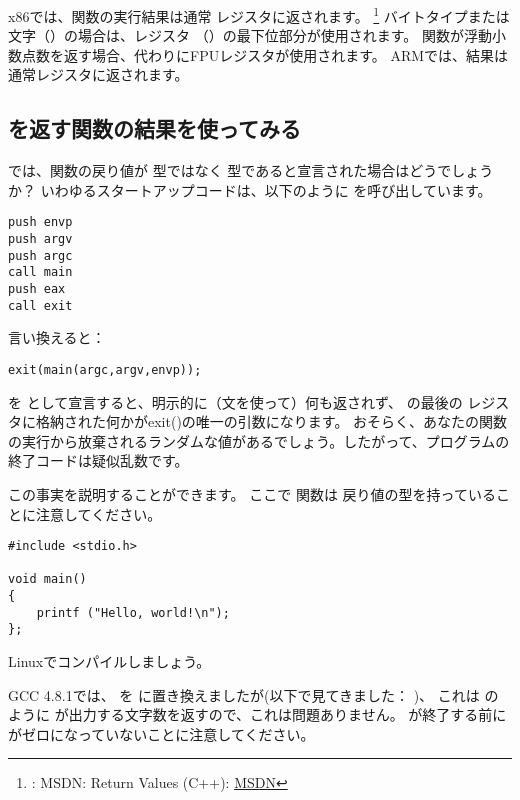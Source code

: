 

x86では、関数の実行結果は通常 \EAX レジスタに返されます。
\footnote{\Seealso: MSDN: Return Values (C++): \href{http://go.yurichev.com/17258}{MSDN}}
バイトタイプまたは文字（\Tchar）の場合は、レジスタ \EAX （\AL）の最下位部分が使用されます。
関数が浮動小数点数を返す場合、代わりにFPUレジスタが使用されます。 
ARMでは、結果は通常レジスタに返されます。

\subsection{\Tvoid を返す関数の結果を使ってみる}
\label{UseResultOfVoidFunc}

では、\main 関数の戻り値が \Tint 型ではなく \Tvoid 型であると宣言された場合はどうでしょうか？
いわゆるスタートアップコードは、以下のように \main を呼び出しています。

\begin{lstlisting}[style=customasmx86]
push envp
push argv
push argc
call main
push eax
call exit
\end{lstlisting}

言い換えると：

\begin{lstlisting}[style=customc]
exit(main(argc,argv,envp));
\end{lstlisting}

\main を \Tvoid として宣言すると、明示的に（文を使って）何も返されず、
\main の最後の \EAX レジスタに格納された何かがexit()の唯一の引数になります。
おそらく、あなたの関数の実行から放棄されるランダムな値があるでしょう。したがって、プログラムの終了コードは疑似乱数です。
\par
この事実を説明することができます。
ここで \main 関数は \Tvoid 戻り値の型を持っていることに注意してください。

\begin{lstlisting}[style=customc]
#include <stdio.h>

void main()
{
	printf ("Hello, world!\n");
};
\end{lstlisting}

Linuxでコンパイルしましょう。

GCC 4.8.1では、 \printf を \puts に置き換えましたが(以下で見てきました： )、
これは \printf のように \puts が出力する文字数を返すので、これは問題ありません。 
\main が終了する前に \EAX がゼロになっていないことに注意してください。

